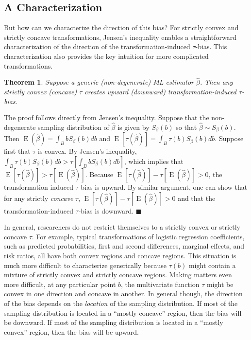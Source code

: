 \documentclass[12pt]{article}
\newtheorem{theorem}{Theorem}
\newenvironment{proof}[1][Proof]{\begin{trivlist}
\item[\hskip \labelsep {\bfseries #1}]}{\end{trivlist}}
\DeclareMathOperator*{\E}{\text{E}}
\begin{document}
\subsection*{A Characterization}

But how can we characterize the direction of this bias? 
For strictly convex and strictly concave transformations, Jensen's inequality enables a straightforward characterization of the direction of the transformation-induced $\tau$-bias. 
This characterization also provides the key intuition for more complicated transformations.
\begin{theorem}\label{thm:direction}
Suppose a generic (non-degenerate) ML estimator $\hat{\beta}$. Then any strictly convex (concave) $\tau$ creates upward (downward) transformation-induced $\tau$-bias.
\end{theorem} 
\begin{proof}
The proof follows directly from Jensen's inequality. 
Suppose that the non-degenerate sampling distribution of $\hat{\beta}$ is given by $S_\beta(b)$ so that $\hat{\beta} \sim S_\beta(b)$. 
Then $\E(\hat{\beta}) = \int_{B}bS_\beta(b)db$ and $\E[\tau(\hat{\beta})]  = \int_{B}\tau(b)S_\beta(b)db$. 
Suppose first that $\tau$ is convex. 
By Jensen's inequality, $\int_{B}\tau(b)S_\beta(b)db > \tau \left[ \int_{B}bS_\beta(b)db \right]$, which implies that $\E[\tau(\hat{\beta})] > \tau[\E(\hat{\beta})]$. 
Because $\E[\tau(\hat{\beta})] - \tau[\E(\hat{\beta})] > 0$, the transformation-induced $\tau$-bias is upward. 
By similar argument, one can show that for any strictly \textit{concave} $\tau$, $\E[\tau(\hat{\beta})] - \tau[\E(\hat{\beta})] > 0$ and that the transformation-induced $\tau$-bias is downward. $\blacksquare$
\end{proof}

In general, researchers do not restrict themselves to a strictly convex or strictly concave $\tau$. 
For example, typical transformations of logistic regression coefficients, such as predicted probabilities, first and second differences, marginal effects, and risk ratios, all have both convex regions and concave regions. 
This situation is much more difficult to characterize generically because $\tau(b)$ might contain a mixture of strictly convex and strictly concave regions. 
Making matters even more difficult, at any particular point $b$, the multivariate function $\tau$ might be convex in one direction and concave in another. 
In general though, the direction of the bias depends on the \textit{location} of the sampling distribution. 
If most of the sampling distribution is located in a ``mostly concave'' region, then the bias will be downward. 
If most of the sampling distribution is located in a ``mostly convex'' region, then the bias will be upward. 
\end{document}
